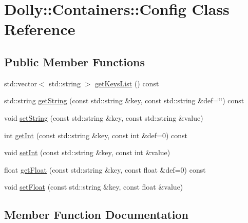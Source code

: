 \hypertarget{class_dolly_1_1_containers_1_1_config}{}\section{Dolly\+:\+:Containers\+:\+:Config Class Reference}
\label{class_dolly_1_1_containers_1_1_config}
\subsection*{Public Member Functions}
\begin{DoxyCompactItemize}
\item 
std\+::vector$<$ std\+::string $>$ \hyperlink{class_dolly_1_1_containers_1_1_config_a310aa82ed6b7fec96d2b65db6dbc1764}{get\+Keys\+List} () const
\item 
std\+::string \hyperlink{class_dolly_1_1_containers_1_1_config_a5f3074bf43036daee2b9dba6f239c8dc}{get\+String} (const std\+::string \&key, const std\+::string \&def=\char`\"{}\char`\"{}) const
\item 
void \hyperlink{class_dolly_1_1_containers_1_1_config_a22ee3849c2bab24160b27601864c9270}{set\+String} (const std\+::string \&key, const std\+::string \&value)
\item 
int \hyperlink{class_dolly_1_1_containers_1_1_config_a5b1b316d4a1b44c5b6034b310797044d}{get\+Int} (const std\+::string \&key, const int \&def=0) const
\item 
void \hyperlink{class_dolly_1_1_containers_1_1_config_a11a53fcd254b554a59e2e7e8d12ed323}{set\+Int} (const std\+::string \&key, const int \&value)
\item 
float \hyperlink{class_dolly_1_1_containers_1_1_config_ac104ac219199206ac5c881024fbe9bc9}{get\+Float} (const std\+::string \&key, const float \&def=0) const
\item 
void \hyperlink{class_dolly_1_1_containers_1_1_config_a30f4c2c146a5b8d1186c306c2c56a9b8}{set\+Float} (const std\+::string \&key, const float \&value)
\end{DoxyCompactItemize}


\subsection{Member Function Documentation}
\mbox{\label{class_dolly_1_1_containers_1_1_config_ac104ac219199206ac5c881024fbe9bc9}} 
